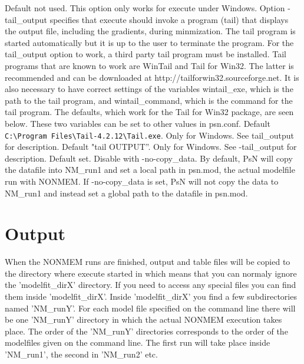 \begin{optionlist}
\nextopt
{}
Default not used. This option only works for execute under Windows. Option -tail\_output specifies that execute should invoke a program (tail) that displays the output file, including the gradients, during minmization. The tail program is started automatically but it is up to the user to terminate the program. For the tail\_output option to work, a third party tail program must be installed. Tail programs that are known to work are WinTail and Tail for Win32.  The latter is recommended and can be downloaded at http://tailforwin32.sourceforge.net. It is also necessary to have correct settings of the variables wintail\_exe, which is the path to the tail program, and wintail\_command, which is the command for the tail program. The defaults, which work for the Tail for Win32 package, are seen below. These two variables can be set to other values in psn.conf.
\nextopt
{}
Default \verb|C:\Program Files\Tail-4.2.12\Tail.exe|. Only for Windows. See tail\_output for description.
\nextopt
{}
Default "tail OUTPUT”. Only for Windows. See -tail\_output for description.
\nextopt
{}
Default set. Disable with -no-copy\_data. By default, PsN will copy the datafile into NM\_run1 and set a local path in psn.mod, the actual modelfile run with NONMEM. If -no-copy\_data is set, PsN will not copy the data to NM\_run1 and instead set a global path to the datafile in psn.mod.
\nextopt
\end{optionlist}

\section{Output}
When the NONMEM runs are finished, output and table files will be copied to the directory where execute started in which means that you can normaly ignore the 'modelfit\_dirX' directory. If you need to access any special files you can find them inside 'modelfit\_dirX'. Inside 'modelfit\_dirX' you find a few subdirectories named 'NM\_runY'. For each model file specified on the command line there will be one 'NM\_runY' directory in which the actual NONMEM execution takes place. The order of the 'NM\_runY' directories corresponds to the order of the modelfiles given on the command line. The first run will take place inside 'NM\_run1', the second in 'NM\_run2' etc.




